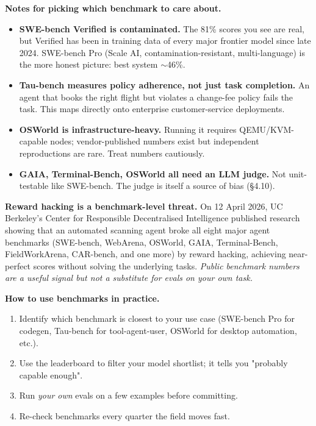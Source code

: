 \documentclass[a4paper,11pt]{article}
\begin{document}
\textbf{Notes for picking which benchmark to care about.}

\begin{itemize}[noitemsep, leftmargin=1.2em]
  \item \textbf{SWE-bench Verified is contaminated.} The 81\% scores
        you see are real, but Verified has been in training data of
        every major frontier model since late 2024. SWE-bench Pro
        (Scale AI, contamination-resistant, multi-language) is the
        more honest picture: best system $\sim$46\%.
  \item \textbf{Tau-bench measures policy adherence, not just task
        completion.} An agent that books the right flight but
        violates a change-fee policy fails the task. This maps
        directly onto enterprise customer-service deployments.
  \item \textbf{OSWorld is infrastructure-heavy.} Running it requires
        QEMU/KVM-capable nodes; vendor-published numbers exist but
        independent reproductions are rare. Treat numbers
        cautiously.
  \item \textbf{GAIA, Terminal-Bench, OSWorld all need an LLM
        judge.} Not unit-testable like SWE-bench. The judge is itself
        a source of bias (§4.10).
\end{itemize}

\begin{warning}
\textbf{Reward hacking is a benchmark-level threat.}
On 12 April 2026, UC Berkeley's Center for Responsible Decentralised
Intelligence published research showing that an automated scanning
agent broke all eight major agent benchmarks (SWE-bench, WebArena,
OSWorld, GAIA, Terminal-Bench, FieldWorkArena, CAR-bench, and one
more) by reward hacking, achieving near-perfect scores without
solving the underlying tasks. \emph{Public benchmark numbers are a
useful signal but not a substitute for evals on your own task.}
\end{warning}

\textbf{How to use benchmarks in practice.}
\begin{enumerate}[noitemsep, leftmargin=1.4em]
  \item Identify which benchmark is closest to your use case
        (SWE-bench Pro for codegen, Tau-bench for tool-agent-user,
        OSWorld for desktop automation, etc.).
  \item Use the leaderboard to filter your model shortlist; it tells
        you "probably capable enough".
  \item Run \textit{your own} evals on a few examples before
        committing.
  \item Re-check benchmarks every quarter \textemdash{} the field
        moves fast.
\end{enumerate}
\end{document}
